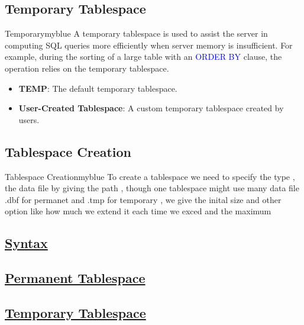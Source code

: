\subsection{Temporary Tablespace}
\begin{prettyBox}{Temporary}{myblue}
A temporary tablespace is used to assist the server in computing 
SQL queries more efficiently when server memory is insufficient. 
For example, during the sorting of a large table with an \textcolor{blue}{ORDER BY} clause, 
the operation relies on the temporary tablespace.

\begin{itemize}
    \item \textbf{TEMP}: The default temporary tablespace.
    \item \textbf{User-Created Tablespace}: A custom temporary tablespace created by users.
\end{itemize}
\end{prettyBox}

\vspace{0.25cm}

\subsection{Tablespace Creation}
\begin{prettyBox}{Tablespace Creation}{myblue}
To create a tablespace we need to specify the type , the data file by giving the path ,
though one tablespace might use many data file .dbf for permanet and .tmp for temporary ,
we give the inital size and other option like how much we extend it each time we exced and the maximum
\end{prettyBox}

\vspace{0.25cm}

\subsection*{\underline{Syntax}}

\subsection*{\underline{Permanent Tablespace}}



\subsection*{\underline{Temporary Tablespace}}



